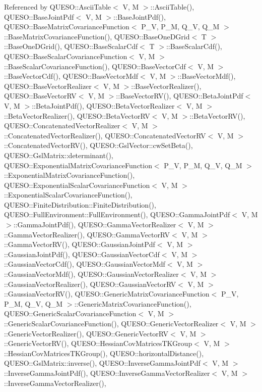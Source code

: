 Referenced by Q\-U\-E\-S\-O\-::\-Ascii\-Table$<$ V, M $>$\-::\-Ascii\-Table(), Q\-U\-E\-S\-O\-::\-Base\-Joint\-Pdf$<$ V, M $>$\-::\-Base\-Joint\-Pdf(), Q\-U\-E\-S\-O\-::\-Base\-Matrix\-Covariance\-Function$<$ P\-\_\-\-V, P\-\_\-\-M, Q\-\_\-\-V, Q\-\_\-\-M $>$\-::\-Base\-Matrix\-Covariance\-Function(), Q\-U\-E\-S\-O\-::\-Base\-One\-D\-Grid$<$ T $>$\-::\-Base\-One\-D\-Grid(), Q\-U\-E\-S\-O\-::\-Base\-Scalar\-Cdf$<$ T $>$\-::\-Base\-Scalar\-Cdf(), Q\-U\-E\-S\-O\-::\-Base\-Scalar\-Covariance\-Function$<$ V, M $>$\-::\-Base\-Scalar\-Covariance\-Function(), Q\-U\-E\-S\-O\-::\-Base\-Vector\-Cdf$<$ V, M $>$\-::\-Base\-Vector\-Cdf(), Q\-U\-E\-S\-O\-::\-Base\-Vector\-Mdf$<$ V, M $>$\-::\-Base\-Vector\-Mdf(), Q\-U\-E\-S\-O\-::\-Base\-Vector\-Realizer$<$ V, M $>$\-::\-Base\-Vector\-Realizer(), Q\-U\-E\-S\-O\-::\-Base\-Vector\-R\-V$<$ V, M $>$\-::\-Base\-Vector\-R\-V(), Q\-U\-E\-S\-O\-::\-Beta\-Joint\-Pdf$<$ V, M $>$\-::\-Beta\-Joint\-Pdf(), Q\-U\-E\-S\-O\-::\-Beta\-Vector\-Realizer$<$ V, M $>$\-::\-Beta\-Vector\-Realizer(), Q\-U\-E\-S\-O\-::\-Beta\-Vector\-R\-V$<$ V, M $>$\-::\-Beta\-Vector\-R\-V(), Q\-U\-E\-S\-O\-::\-Concatenated\-Vector\-Realizer$<$ V, M $>$\-::\-Concatenated\-Vector\-Realizer(), Q\-U\-E\-S\-O\-::\-Concatenated\-Vector\-R\-V$<$ V, M $>$\-::\-Concatenated\-Vector\-R\-V(), Q\-U\-E\-S\-O\-::\-Gsl\-Vector\-::cw\-Set\-Beta(), Q\-U\-E\-S\-O\-::\-Gsl\-Matrix\-::determinant(), Q\-U\-E\-S\-O\-::\-Exponential\-Matrix\-Covariance\-Function$<$ P\-\_\-\-V, P\-\_\-\-M, Q\-\_\-\-V, Q\-\_\-\-M $>$\-::\-Exponential\-Matrix\-Covariance\-Function(), Q\-U\-E\-S\-O\-::\-Exponential\-Scalar\-Covariance\-Function$<$ V, M $>$\-::\-Exponential\-Scalar\-Covariance\-Function(), Q\-U\-E\-S\-O\-::\-Finite\-Distribution\-::\-Finite\-Distribution(), Q\-U\-E\-S\-O\-::\-Full\-Environment\-::\-Full\-Environment(), Q\-U\-E\-S\-O\-::\-Gamma\-Joint\-Pdf$<$ V, M $>$\-::\-Gamma\-Joint\-Pdf(), Q\-U\-E\-S\-O\-::\-Gamma\-Vector\-Realizer$<$ V, M $>$\-::\-Gamma\-Vector\-Realizer(), Q\-U\-E\-S\-O\-::\-Gamma\-Vector\-R\-V$<$ V, M $>$\-::\-Gamma\-Vector\-R\-V(), Q\-U\-E\-S\-O\-::\-Gaussian\-Joint\-Pdf$<$ V, M $>$\-::\-Gaussian\-Joint\-Pdf(), Q\-U\-E\-S\-O\-::\-Gaussian\-Vector\-Cdf$<$ V, M $>$\-::\-Gaussian\-Vector\-Cdf(), Q\-U\-E\-S\-O\-::\-Gaussian\-Vector\-Mdf$<$ V, M $>$\-::\-Gaussian\-Vector\-Mdf(), Q\-U\-E\-S\-O\-::\-Gaussian\-Vector\-Realizer$<$ V, M $>$\-::\-Gaussian\-Vector\-Realizer(), Q\-U\-E\-S\-O\-::\-Gaussian\-Vector\-R\-V$<$ V, M $>$\-::\-Gaussian\-Vector\-R\-V(), Q\-U\-E\-S\-O\-::\-Generic\-Matrix\-Covariance\-Function$<$ P\-\_\-\-V, P\-\_\-\-M, Q\-\_\-\-V, Q\-\_\-\-M $>$\-::\-Generic\-Matrix\-Covariance\-Function(), Q\-U\-E\-S\-O\-::\-Generic\-Scalar\-Covariance\-Function$<$ V, M $>$\-::\-Generic\-Scalar\-Covariance\-Function(), Q\-U\-E\-S\-O\-::\-Generic\-Vector\-Realizer$<$ V, M $>$\-::\-Generic\-Vector\-Realizer(), Q\-U\-E\-S\-O\-::\-Generic\-Vector\-R\-V$<$ V, M $>$\-::\-Generic\-Vector\-R\-V(), Q\-U\-E\-S\-O\-::\-Hessian\-Cov\-Matrices\-T\-K\-Group$<$ V, M $>$\-::\-Hessian\-Cov\-Matrices\-T\-K\-Group(), Q\-U\-E\-S\-O\-::horizontal\-Distance(), Q\-U\-E\-S\-O\-::\-Gsl\-Matrix\-::inverse(), Q\-U\-E\-S\-O\-::\-Inverse\-Gamma\-Joint\-Pdf$<$ V, M $>$\-::\-Inverse\-Gamma\-Joint\-Pdf(), Q\-U\-E\-S\-O\-::\-Inverse\-Gamma\-Vector\-Realizer$<$ V, M $>$\-::\-Inverse\-Gamma\-Vector\-Realizer(), 